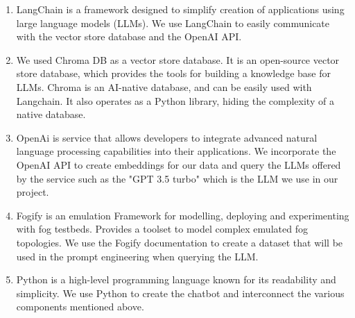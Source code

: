 \begin{enumerate}
    \item LangChain \cite{langchain} is a framework designed to simplify
          creation of
          applications using large language models (LLMs). We use LangChain to
          easily communicate with the vector store database and the OpenAI API.

    \item We used Chroma DB \cite{chromadb} as a vector store database. It is
          an open-source vector store database, which provides the
          tools for building a knowledge base for LLMs. Chroma is an AI-native
          database, and can be easily used with Langchain. It also operates as
          a Python library, hiding the complexity of a native database.

    \item OpenAi is service that allows developers to integrate advanced
          natural language processing capabilities into their applications. We
          incorporate the OpenAI API to create embeddings for our data and
          query the LLMs
          offered by the
          service such as the "GPT 3.5 turbo" which is the LLM we use in our
          project.

    \item Fogify is an emulation Framework for modelling,
          deploying and
          experimenting
          with fog testbeds. Provides a toolset to model complex emulated fog
          topologies. We use the Fogify documentation to create a dataset that
          will be
          used in the prompt engineering when querying the LLM.
    \item Python is a high-level programming language known for its
          readability and simplicity. We use Python to create the chatbot and
          interconnect the various components mentioned above.
\end{enumerate}
